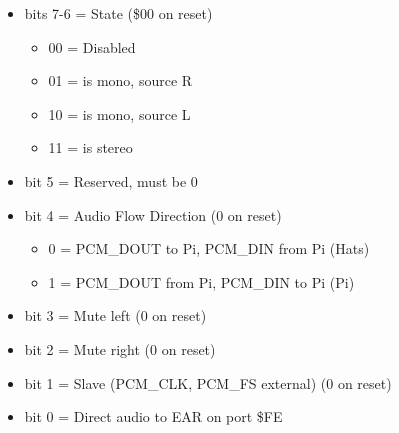 \begin{itemize}
\item bits 7-6 = \iis State (\$00 on reset)
  \begin{itemize}
  \item 00 = \iis Disabled
  \item 01 = \iis is mono, source R
  \item 10 = \iis is mono, source L
  \item 11 = \iis is stereo
  \end{itemize}
\item bit 5 = Reserved, must be 0
\item bit 4 = Audio Flow Direction (0 on reset)
  \begin{itemize}
  \item 0 = PCM\_DOUT to Pi, PCM\_DIN from Pi (Hats)
  \item 1 = PCM\_DOUT from Pi, PCM\_DIN to Pi (Pi)
  \end{itemize}
\item bit 3 = Mute left (0 on reset)
\item bit 2 = Mute right (0 on reset)
\item bit 1 = Slave (PCM\_CLK, PCM\_FS external) (0 on reset)
\item bit 0 = Direct \iis audio to EAR on port \$FE
\end{itemize}

